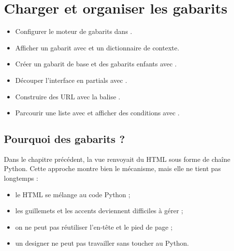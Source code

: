 \chapter{Charger et organiser les gabarits}
\label{ch:gabarits}


\begin{objectifs}
\begin{itemize}
  \item Configurer le moteur de gabarits dans .
  \item Afficher un gabarit avec  et un dictionnaire de contexte.
  \item Créer un gabarit de base et des gabarits enfants avec .
  \item Découper l'interface en partials avec .
  \item Construire des URL avec la balise .
  \item Parcourir une liste avec  et afficher des conditions avec
        .
\end{itemize}
\end{objectifs}

\section{Pourquoi des gabarits ?}

Dans le chapitre précédent, la vue renvoyait du HTML sous forme de chaîne Python.
Cette approche montre bien le mécanisme, mais elle ne tient pas longtemps :
\begin{itemize}
  \item le HTML se mélange au code Python ;
  \item les guillemets et les accents deviennent difficiles à gérer ;
  \item on ne peut pas réutiliser l'en-tête et le pied de page ;
  \item un designer ne peut pas travailler sans toucher au Python.
\end{itemize}

